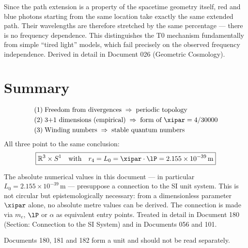 \begin{keypoint}
Since the path extension is a property of the spacetime geometry itself, red and blue photons starting from the same location take exactly the same extended path. Their wavelengths are therefore stretched by the same percentage — there is no frequency dependence. This distinguishes the T0 mechanism fundamentally from simple ``tired light'' models, which fail precisely on the observed frequency independence. Derived in detail in Document 026 (Geometric Cosmology).
\end{keypoint}

\section{Summary}

\begin{keyresult}
\begin{align}
	(1)\; & \text{Freedom from divergences} \;\Rightarrow\; \text{periodic topology} \notag \\
	(2)\; & \text{3+1 dimensions (empirical)} \;\Rightarrow\; \text{form of } \xipar = 4/30000 \notag \\
	(3)\; & \text{Winding numbers} \;\Rightarrow\; \text{stable quantum numbers} \notag
\end{align}
All three point to the same conclusion:
\begin{equation}
	\boxed{\mathbb{R}^3 \times S^1 \quad \text{with} \quad r_4 = L_0 = \xipar \cdot \lP = 2{.}155 \times 10^{-39}\,\text{m}}
\end{equation}
\end{keyresult}

\begin{foundation}
The absolute numerical values in this document — in particular $L_0 = 2{.}155 \times 10^{-39}\,\text{m}$ — presuppose a connection to the SI unit system. This is not circular but epistemologically necessary: from a dimensionless parameter $\xipar$ alone, no absolute metre values can be derived. The connection is made via $m_e$, $\lP$ or $\alpha$ as equivalent entry points. Treated in detail in Document 180 (Section: Connection to the SI System) and in Documents 056 and 101.

Documents 180, 181 and 182 form a unit and should not be read separately.
\end{foundation}
